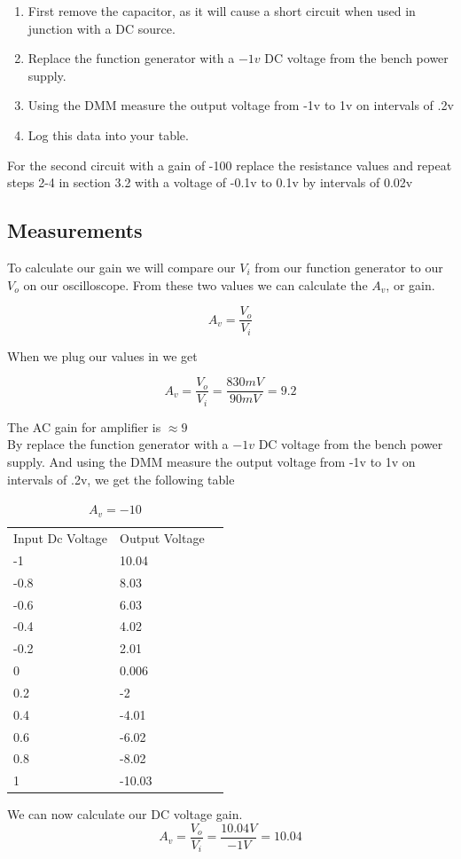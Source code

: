 \documentclass[12pt]{article}
\begin{document}
\begin{enumerate}
	\item First remove the capacitor, as it will cause a short circuit when used in junction with a DC source.
	\item Replace the function generator with a $-1v$ DC voltage from the bench power supply.
	\item Using the DMM measure the output voltage from -1v to 1v on intervals of .2v
	\item Log this data into your table.
	
\end{enumerate}

For the second circuit with a gain of -100 replace the resistance values and repeat steps 2-4 in section 3.2 with a voltage of -0.1v to 0.1v by intervals of 0.02v

\newpage


\subsection{Measurements}

To calculate our gain we will compare our $V_i$ from our function generator to our $V_o$ on our oscilloscope. From these two values we can calculate the $A_v$, or gain.

$$A_v = \frac{V_o}{V_i}$$

When we plug our values in we get

$$A_v = \frac{V_o}{V_i} = \frac{830mV}{90mV} = 9.2$$

The AC gain for amplifier is $\approx 9$\\

By replace the function generator with a $-1v$ DC voltage from the bench power supply.
And using the DMM measure the output voltage from -1v to 1v on intervals of .2v, we get the following table

\begin{table}[!h]
	\centering
	\caption{$A_v=-10$}
	\label{my-label}
	\begin{tabular}{lll}
		Input Dc Voltage & Output Voltage &  \\
		-1               & 10.04          &  \\
		-0.8             & 8.03           &  \\
		-0.6             & 6.03           &  \\
		-0.4             & 4.02           &  \\
		-0.2             & 2.01           &  \\
		0                & 0.006          &  \\
		0.2              & -2             &  \\
		0.4              & -4.01          &  \\
		0.6              & -6.02          &  \\
		0.8              & -8.02          &  \\
		1                & -10.03         & 
	\end{tabular}
\end{table}
We can now calculate our DC voltage gain.
$$A_v = \frac{V_o}{V_i} = \frac{10.04V}{-1V} = 10.04$$
\end{document}

